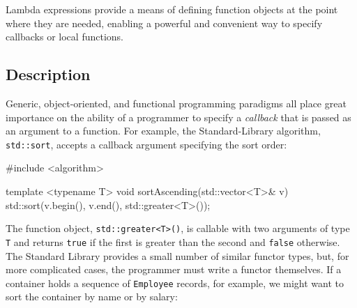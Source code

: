 

\label{lambda-expressions}
\setcounter{table}{0}
\setcounter{footnote}{0}
\setcounter{lstlisting}{0}

Lambda expressions provide a means of defining function objects at the
point where they are needed, enabling a powerful and convenient way to
specify callbacks or local functions.

\subsection[Description]{Description}\label{description}

Generic, object-oriented, and functional programming paradigms all place
great importance on the ability of a programmer to specify a
\emph{callback} that is passed as an argument to a function. For
example, the Standard-Library algorithm, \lstinline!std::sort!, accepts a
callback argument specifying the sort order:

\begin{emcppslisting}
#include <algorithm>

template <typename T>
void sortAscending(std::vector<T>& v)
{
    std::sort(v.begin(), v.end(), std::greater<T>());
}
\end{emcppslisting}
    

The function object, \lstinline!std::greater<T>()!, is callable with two
arguments of type \lstinline!T! and returns \lstinline!true! if the first is
greater than the second and \lstinline!false! otherwise. The Standard
Library provides a small number of similar functor types, but, for more
complicated cases, the programmer must write a functor themselves. If a
container holds a sequence of \lstinline!Employee! records, for example, we
might want to sort the container by name or by salary:

